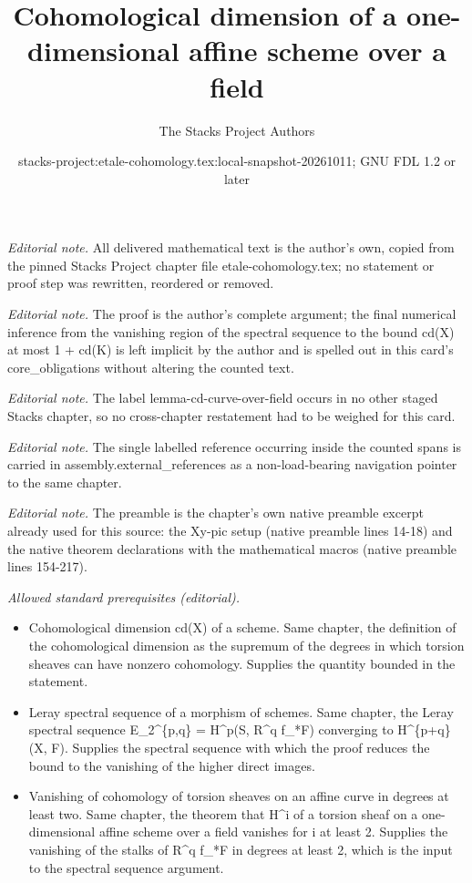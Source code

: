 \documentclass[10pt,a4paper]{amsart}
\title{Cohomological dimension of a one-dimensional affine scheme over a field}
\author{The Stacks Project Authors}
\date{stacks-project:etale-cohomology.tex:local-snapshot-20261011; GNU FDL 1.2 or later}
\theoremstyle{plain}
\theoremstyle{definition}
\theoremstyle{remark}
\numberwithin{equation}{subsection}
\begin{document}
\maketitle
\noindent\textit{Editorial note.} All delivered mathematical text is the author's own, copied from the pinned Stacks Project chapter file etale-cohomology.tex; no statement or proof step was rewritten, reordered or removed.\par\medskip
\noindent\textit{Editorial note.} The proof is the author's complete argument; the final numerical inference from the vanishing region of the spectral sequence to the bound cd(X) at most 1 + cd(K) is left implicit by the author and is spelled out in this card's core\_obligations without altering the counted text.\par\medskip
\noindent\textit{Editorial note.} The label lemma-cd-curve-over-field occurs in no other staged Stacks chapter, so no cross-chapter restatement had to be weighed for this card.\par\medskip
\noindent\textit{Editorial note.} The single labelled reference occurring inside the counted spans is carried in assembly.external\_references as a non-load-bearing navigation pointer to the same chapter.\par\medskip
\noindent\textit{Editorial note.} The preamble is the chapter's own native preamble excerpt already used for this source: the Xy-pic setup (native preamble lines 14-18) and the native theorem declarations with the mathematical macros (native preamble lines 154-217).\par\medskip
\noindent\textit{Allowed standard prerequisites (editorial).}\begin{itemize}
\item Cohomological dimension cd(X) of a scheme. Same chapter, the definition of the cohomological dimension as the supremum of the degrees in which torsion sheaves can have nonzero cohomology. Supplies the quantity bounded in the statement.
\item Leray spectral sequence of a morphism of schemes. Same chapter, the Leray spectral sequence E\_2\textasciicircum{}\{p,q\} = H\textasciicircum{}p(S, R\textasciicircum{}q f\_*F) converging to H\textasciicircum{}\{p+q\}(X, F). Supplies the spectral sequence with which the proof reduces the bound to the vanishing of the higher direct images.
\item Vanishing of cohomology of torsion sheaves on an affine curve in degrees at least two. Same chapter, the theorem that H\textasciicircum{}i of a torsion sheaf on a one-dimensional affine scheme over a field vanishes for i at least 2. Supplies the vanishing of the stalks of R\textasciicircum{}q f\_*F in degrees at least 2, which is the input to the spectral sequence argument.
\end{itemize}\medskip
\end{document}

